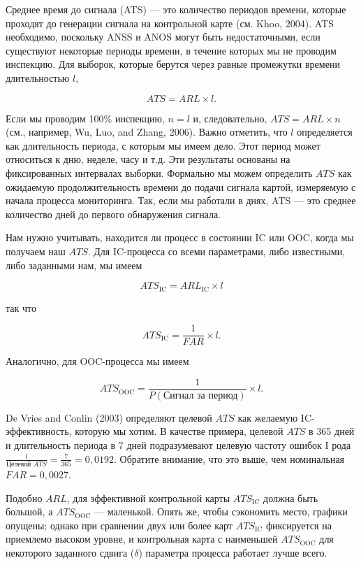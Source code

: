 Среднее время до сигнала (ATS) — это количество периодов времени, которые проходят до генерации сигнала на контрольной карте (см. Khoo, 2004). ATS необходимо, поскольку ANSS и ANOS могут быть недостаточными, если существуют некоторые периоды времени, в течение которых мы не проводим инспекцию. Для выборок, которые берутся через равные промежутки времени длительностью \(l\),

\[
ATS = ARL \times l.
\]

Если мы проводим 100\% инспекцию, \(n = l\) и, следовательно, \(ATS = ARL \times n\) (см., например, Wu, Luo, and Zhang, 2006). Важно отметить, что \(l\) определяется как длительность периода, с которым мы имеем дело. Этот период может относиться к дню, неделе, часу и т.д. Эти результаты основаны на фиксированных интервалах выборки. Формально мы можем определить \(ATS\) как ожидаемую продолжительность времени до подачи сигнала картой, измеряемую с начала процесса мониторинга. Так, если мы работали в днях, ATS — это среднее количество дней до первого обнаружения сигнала.

Нам нужно учитывать, находится ли процесс в состоянии IC или OOC, когда мы получаем наш \(ATS\). Для IC-процесса со всеми параметрами, либо известными, либо заданными нам, мы имеем

\[
ATS_{\text{IC}} = ARL_{\text{IC}} \times l
\]

так что

\[
ATS_{\text{IC}} = \frac{1}{FAR} \times l.
\]

Аналогично, для OOC-процесса мы имеем

\[
ATS_{\text{OOC}} = \frac{1}{P(\text{Сигнал за период})} \times l.
\]

De Vries and Conlin (2003) определяют целевой \(ATS\) как желаемую IC-эффективность, которую мы хотим. В качестве примера, целевой \(ATS\) в 365 дней и длительность периода в 7 дней подразумевают целевую частоту ошибок I рода \(\frac{l}{\text{Целевой } ATS} = \frac{7}{365} = 0,0192\). Обратите внимание, что это выше, чем номинальная \(FAR = 0,0027\).

Подобно \(ARL\), для эффективной контрольной карты \(ATS_{\text{IC}}\) должна быть большой, а \(ATS_{\text{OOC}}\) — маленькой. Опять же, чтобы сэкономить место, графики опущены; однако при сравнении двух или более карт \(ATS_{\text{IC}}\) фиксируется на приемлемо высоком уровне, и контрольная карта с наименьшей \(ATS_{\text{OOC}}\) для некоторого заданного сдвига (\(\delta\)) параметра процесса работает лучше всего.

